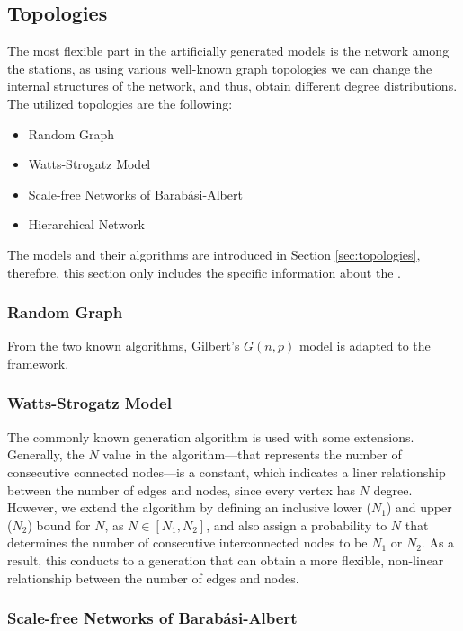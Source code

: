 \subsection{Topologies}
The most flexible part in the artificially generated models is the network among the stations, as using various well-known graph topologies we can change the internal structures of the network, and thus, obtain different degree distributions. The utilized topologies are the following:
\begin{itemize}
	\item Random Graph
	\item Watts-Strogatz Model
	\item Scale-free Networks of Barabási-Albert
	\item Hierarchical Network
\end{itemize}
The models and their algorithms are introduced in Section \ref{sec:topologies}, therefore, this section only includes the specific information about the .

\subsubsection{Random Graph}
From the two known algorithms, Gilbert's $G(n,p)$ model is adapted to the framework.

\subsubsection{Watts-Strogatz Model}\label{sec:watts_generation}

The commonly known generation algorithm is used with some extensions. Generally, the $N$ value in the algorithm---that represents the number of consecutive connected nodes---is a constant, which indicates a liner relationship between the number of edges and nodes, since every vertex has $N$ degree. However, we extend the algorithm by defining an inclusive lower ($N_1$) and upper ($N_2$) bound for $N$, as $N\in[N_1, N_2]$, and also assign a probability to $N$ that determines the number of consecutive interconnected nodes to be $N_1$ or $N_2$. As a result, this conducts to a generation that can obtain a more flexible, non-linear relationship between the number of edges and nodes.

\subsubsection{Scale-free Networks of Barabási-Albert}

